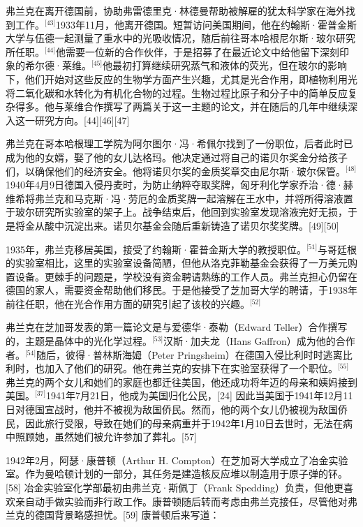弗兰克在离开德国前，协助弗雷德里克·林德曼帮助被解雇的犹太科学家在海外找到工作。\(^\text{[43]}\)1933年11月，他离开德国。短暂访问美国期间，他在约翰斯·霍普金斯大学与伍德一起测量了重水中的光吸收情况，随后前往哥本哈根尼尔斯·玻尔研究所任职。\(^\text{[44]}\)他需要一位新的合作伙伴，于是招募了在最近论文中给他留下深刻印象的希尔德·莱维。\(^\text{[45]}\)他最初打算继续研究蒸气和液体的荧光，但在玻尔的影响下，他们开始对这些反应的生物学方面产生兴趣，尤其是光合作用，即植物利用光将二氧化碳和水转化为有机化合物的过程。生物过程比原子和分子中的简单反应复杂得多。他与莱维合作撰写了两篇关于这一主题的论文，并在随后的几年中继续深入这一研究方向。[44][46][47]

弗兰克在哥本哈根理工学院为阿尔图尔·冯·希佩尔找到了一份职位，后者此时已成为他的女婿，娶了他的女儿达格玛。他决定通过将自己的诺贝尔奖金分给孩子们，以确保他们的经济安全。他将诺贝尔奖的金质奖章交由尼尔斯·玻尔保管。\(^\text{[48]}\)1940年4月9日德国入侵丹麦时，为防止纳粹夺取奖牌，匈牙利化学家乔治·德·赫维希将弗兰克和马克斯·冯·劳厄的金质奖牌一起溶解在王水中，并将所得溶液置于玻尔研究所实验室的架子上。战争结束后，他回到实验室发现溶液完好无损，于是将金从酸中沉淀出来。诺贝尔基金会随后重新铸造了诺贝尔奖奖牌。[49][50]

1935年，弗兰克移居美国，接受了约翰斯·霍普金斯大学的教授职位。\(^\text{[51]}\)与哥廷根的实验室相比，这里的实验室设备简陋，但他从洛克菲勒基金会获得了一万美元购置设备。更棘手的问题是，学校没有资金聘请熟练的工作人员。弗兰克担心仍留在德国的家人，需要资金帮助他们移民。于是他接受了芝加哥大学的聘请，于1938年前往任职，他在光合作用方面的研究引起了该校的兴趣。\(^\text{[52]}\)

弗兰克在芝加哥发表的第一篇论文是与爱德华·泰勒（Edward Teller）合作撰写的，主题是晶体中的光化学过程。\(^\text{[53]}\)汉斯·加夫龙（Hans Gaffron）成为他的合作者。\(^\text{[54]}\)随后，彼得·普林斯海姆（Peter Pringsheim）在德国入侵比利时时逃离比利时，也加入了他们的研究。他在弗兰克的安排下在实验室获得了一个职位。\(^\text{[55]}\)弗兰克的两个女儿和她们的家庭也都迁往美国，他还成功将年迈的母亲和姨妈接到美国。\(^\text{[37]}\)1941年7月21日，他成为美国归化公民，[24] 因此当美国于1941年12月11日对德国宣战时，他并不被视为敌国侨民。然而，他的两个女儿仍被视为敌国侨民，因此旅行受限，导致在她们的母亲病重并于1942年1月10日去世时，无法在病中照顾她，虽然她们被允许参加了葬礼。[57]

1942年2月，阿瑟·康普顿（Arthur H. Compton）在芝加哥大学成立了冶金实验室。作为曼哈顿计划的一部分，其任务是建造核反应堆以制造用于原子弹的钚。[58] 冶金实验室化学部最初由弗兰克·斯佩丁（Frank Spedding）负责，但他更喜欢亲自动手做实验而非行政工作。康普顿随后转而考虑由弗兰克接任，尽管他对弗兰克的德国背景略感担忧。[59] 康普顿后来写道：

